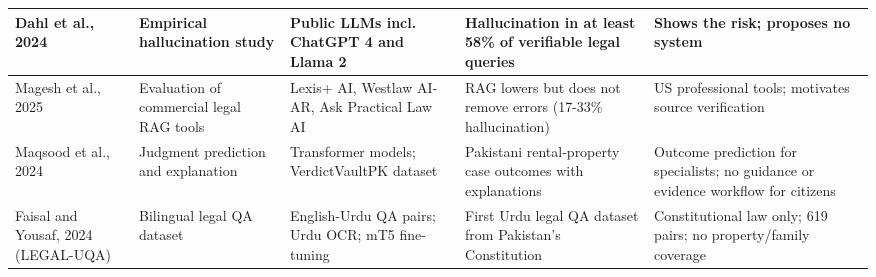 \begin{longtable}{|L{1.76cm}|L{1.95cm}|L{2.54cm}|L{3.39cm}|L{3.91cm}|}
Dahl et al., 2024 \cite{r8} & Empirical hallucination study & Public LLMs incl. ChatGPT 4 and Llama 2 & Hallucination in at least 58\% of verifiable legal queries & Shows the risk; proposes no system \\ \hline
Magesh et al., 2025 \cite{r9} & Evaluation of commercial legal RAG tools & Lexis+ AI, Westlaw AI-AR, Ask Practical Law AI & RAG lowers but does not remove errors (17-33\% hallucination) & US professional tools; motivates source verification \\ \hline
Maqsood et al., 2024 \cite{r18} & Judgment prediction and explanation & Transformer models; VerdictVaultPK dataset & Pakistani rental-property case outcomes with explanations & Outcome prediction for specialists; no guidance or evidence workflow for citizens \\ \hline
Faisal and Yousaf, 2024 (LEGAL-UQA) \cite{r19} & Bilingual legal QA dataset & English-Urdu QA pairs; Urdu OCR; mT5 fine-tuning & First Urdu legal QA dataset from Pakistan's Constitution & Constitutional law only; 619 pairs; no property/family coverage \\
\end{longtable}


